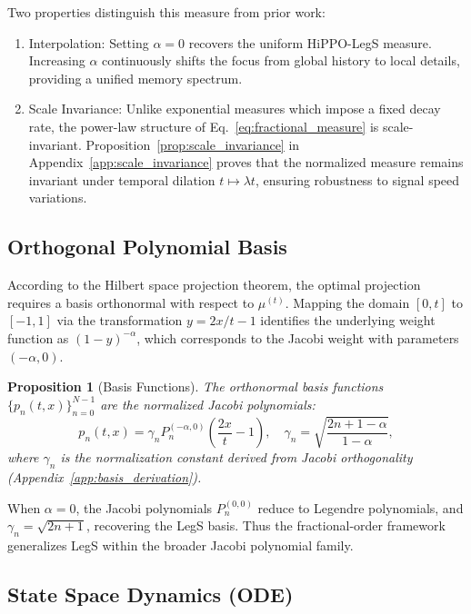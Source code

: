 \documentclass{article}
\theoremstyle{plain}
\newtheorem{proposition}[theorem]{Proposition}
\theoremstyle{definition}
\theoremstyle{remark}
\begin{document}
Two properties distinguish this measure from prior work:
\begin{enumerate}
	\item Interpolation: Setting $\alpha=0$ recovers the uniform HiPPO-LegS measure. Increasing $\alpha$ continuously shifts the focus from global history to local details, providing a unified memory spectrum.
	\item Scale Invariance: Unlike exponential measures which impose a fixed decay rate, the power-law structure of Eq.~\eqref{eq:fractional_measure} is scale-invariant. Proposition~\ref{prop:scale_invariance} in Appendix~\ref{app:scale_invariance} proves that the normalized measure remains invariant under temporal dilation $t \mapsto \lambda t$, ensuring robustness to signal speed variations.
\end{enumerate}

\subsection{Orthogonal Polynomial Basis}
\label{subsec:orthogonal_basis}

According to the Hilbert space projection theorem, the optimal projection requires a basis orthonormal with respect to $\mu^{(t)}$. Mapping the domain $[0, t]$ to $[-1, 1]$ via the transformation $y = 2x/t - 1$ identifies the underlying weight function as $(1-y)^{-\alpha}$, which corresponds to the Jacobi weight with parameters $(-\alpha, 0)$.

\begin{proposition}[Basis Functions]
	\label{prop:basis}
	The orthonormal basis functions $\{p_n(t, x)\}_{n=0}^{N-1}$ are the normalized Jacobi polynomials:
	\begin{equation}
		p_n(t, x) = \gamma_n P_n^{(-\alpha, 0)}\left(\frac{2x}{t} - 1\right), \quad \gamma_n = \sqrt{\frac{2n+1-\alpha}{1-\alpha}},
		\label{eq:normalized_basis}
	\end{equation}
	where $\gamma_n$ is the normalization constant derived from Jacobi orthogonality (Appendix~\ref{app:basis_derivation}).
\end{proposition}

When $\alpha = 0$, the Jacobi polynomials $P_n^{(0,0)}$ reduce to Legendre polynomials, and $\gamma_n = \sqrt{2n+1}$, recovering the LegS basis.
Thus the fractional-order framework generalizes LegS within the broader Jacobi polynomial family.

\subsection{State Space Dynamics (ODE)}
\label{subsec:dynamics}
\end{document}
